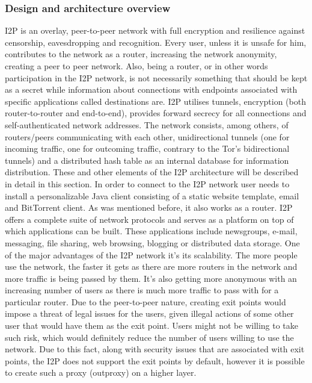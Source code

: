 \subsubsection{Design and architecture overview}
I2P is an overlay, peer-to-peer network with full encryption and resilience against censorship, eavesdropping and recognition. Every user, unless it is unsafe for him, contributes to the network as a router, increasing the network anonymity, creating a peer to peer network. Also, being a router, or in other words participation in the I2P network, is not necessarily something that should be kept as a secret while information about connections with endpoints associated with specific applications called destinations are.
I2P utilises tunnels, encryption (both router-to-router and end-to-end), provides forward secrecy for all connections and self-authenticated network addresses.
The network consists, among others, of routers/peers communicating with each other, unidirectional tunnels (one for incoming traffic, one for outcoming traffic, contrary to the Tor’s bidirectional tunnels) and a distributed hash table as an internal database for information distribution. These and other elements of the I2P architecture will be described in detail in this section.
In order to connect to the I2P network user needs to install a personalizable Java client consisting of a static website template, email and BitTorrent client. As was mentioned before, it also works as a router.
I2P offers a complete suite of network protocols and serves as a platform on top of which applications can be built. These applications include newsgroups, e-mail, messaging, file sharing, web browsing, blogging or distributed data storage.
One of the major advantages of the I2P network it’s its scalability. The more people use the network, the faster it gets as there are more routers in the network and more traffic is being passed by them. It’s also getting more anonymous with an increasing number of users as there is much more traffic to pass with for a particular router. Due to the peer-to-peer nature, creating exit points would impose a threat of legal issues for the users, given illegal actions of some other user that would have them as the exit point. Users might not be willing to take such risk, which would definitely reduce the number of users willing to use the network. Due to this fact, along with security issues that are associated with exit points, the I2P does not support the exit points by default, however it is possible to create such a proxy (outproxy) on a higher layer.

